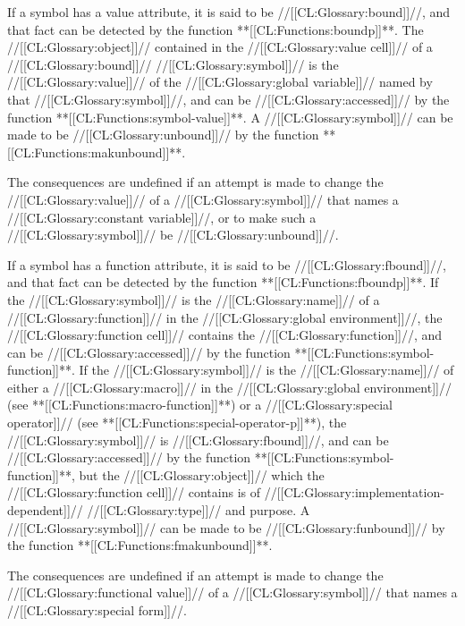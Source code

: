 
If a symbol has a value attribute, it is said to be //[[CL:Glossary:bound]]//, and that fact can be detected by the function **[[CL:Functions:boundp]]**. The //[[CL:Glossary:object]]// contained in the //[[CL:Glossary:value cell]]// of a //[[CL:Glossary:bound]]// //[[CL:Glossary:symbol]]// is the //[[CL:Glossary:value]]// of the //[[CL:Glossary:global variable]]// named by that //[[CL:Glossary:symbol]]//, and can be //[[CL:Glossary:accessed]]// by the function **[[CL:Functions:symbol-value]]**. A //[[CL:Glossary:symbol]]// can be made to be //[[CL:Glossary:unbound]]// by the function **[[CL:Functions:makunbound]]**.

The consequences are undefined if an attempt is made to change the //[[CL:Glossary:value]]// of a //[[CL:Glossary:symbol]]// that names a //[[CL:Glossary:constant variable]]//, or to make such a //[[CL:Glossary:symbol]]// be //[[CL:Glossary:unbound]]//.


If a symbol has a function attribute, it is said to be //[[CL:Glossary:fbound]]//, and that fact can be detected by the function **[[CL:Functions:fboundp]]**. If the //[[CL:Glossary:symbol]]// is the //[[CL:Glossary:name]]// of a //[[CL:Glossary:function]]// in the //[[CL:Glossary:global environment]]//, the //[[CL:Glossary:function cell]]// contains the //[[CL:Glossary:function]]//, and can be //[[CL:Glossary:accessed]]// by the function **[[CL:Functions:symbol-function]]**. If the //[[CL:Glossary:symbol]]// is the //[[CL:Glossary:name]]// of either a //[[CL:Glossary:macro]]// in the //[[CL:Glossary:global environment]]// (see **[[CL:Functions:macro-function]]**) or a //[[CL:Glossary:special operator]]// (see **[[CL:Functions:special-operator-p]]**), the //[[CL:Glossary:symbol]]// is //[[CL:Glossary:fbound]]//, and can be //[[CL:Glossary:accessed]]// by the function **[[CL:Functions:symbol-function]]**, but the //[[CL:Glossary:object]]// which the //[[CL:Glossary:function cell]]// contains is of //[[CL:Glossary:implementation-dependent]]// //[[CL:Glossary:type]]// and purpose. A //[[CL:Glossary:symbol]]// can be made to be //[[CL:Glossary:funbound]]// by the function **[[CL:Functions:fmakunbound]]**.

The consequences are undefined if an attempt is made to change the //[[CL:Glossary:functional value]]// of a //[[CL:Glossary:symbol]]// that names a //[[CL:Glossary:special form]]//.

\endlist

